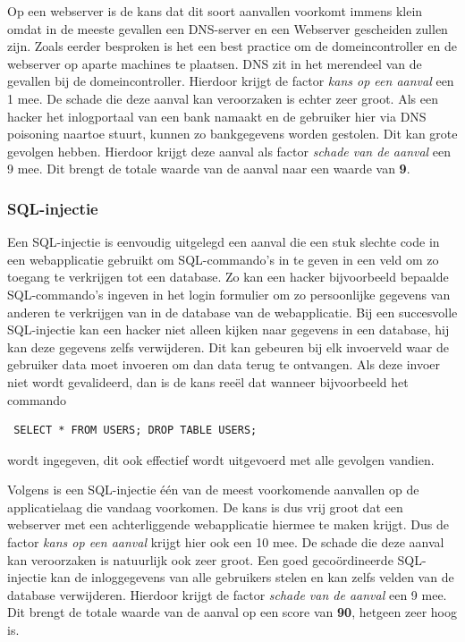 \documentclass[pdftex,a4paper,12pt]{report}
\begin{document}
Op een webserver is de kans dat dit soort aanvallen voorkomt immens klein omdat in de meeste gevallen een DNS-server en een Webserver gescheiden zullen zijn. Zoals eerder besproken is het een best practice om de domeincontroller en de webserver op aparte machines te plaatsen. DNS zit in het merendeel van de gevallen bij de domeincontroller. Hierdoor krijgt de factor \textit{kans op een aanval} een 1 mee. De schade die deze aanval kan veroorzaken is echter zeer groot. Als een hacker het inlogportaal van een bank namaakt en de gebruiker hier via DNS poisoning naartoe stuurt, kunnen zo bankgegevens worden gestolen. Dit kan grote gevolgen hebben. Hierdoor krijgt deze aanval als factor \textit{schade van de aanval} een 9 mee. Dit brengt de totale waarde van de aanval naar een waarde van \textbf{9}.

\subsubsection{SQL-injectie}
Een SQL-injectie is eenvoudig uitgelegd een aanval die een stuk slechte code in een webapplicatie gebruikt om SQL-commando's in te geven in een veld om zo toegang te verkrijgen tot een database. Zo kan een hacker bijvoorbeeld bepaalde SQL-commando's ingeven in het login formulier om zo persoonlijke gegevens van anderen te verkrijgen van in de database van de webapplicatie. Bij een succesvolle SQL-injectie kan een hacker niet alleen kijken naar gegevens in een database, hij kan deze gegevens zelfs verwijderen. Dit kan gebeuren bij elk invoerveld waar de gebruiker data moet invoeren om dan data terug te ontvangen. Als deze invoer niet wordt gevalideerd, dan is de kans reeël dat wanneer bijvoorbeeld het commando \begin{verbatim} SELECT * FROM USERS; DROP TABLE USERS;\end{verbatim} wordt ingegeven, dit ook effectief wordt uitgevoerd met alle gevolgen vandien. \citep{Acunetix2014} \newline

Volgens \cite{Acunetix2014} is een SQL-injectie één van de meest voorkomende aanvallen op de applicatielaag die vandaag voorkomen. De kans is dus vrij groot dat een webserver met een achterliggende webapplicatie hiermee te maken krijgt. Dus de factor \textit{kans op een aanval} krijgt hier ook een 10 mee. De schade die deze aanval kan veroorzaken is natuurlijk ook zeer groot. Een goed gecoördineerde SQL-injectie kan de inloggegevens van alle gebruikers stelen en kan zelfs velden van de database verwijderen. Hierdoor krijgt de factor \textit{schade van de aanval} een 9 mee. Dit brengt de totale waarde van de aanval op een score van \textbf{90}, hetgeen zeer hoog is.
\end{document}
